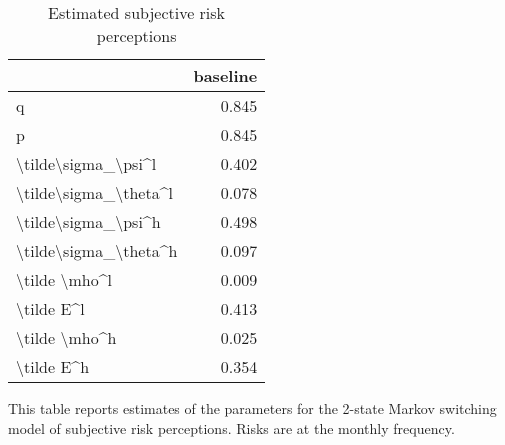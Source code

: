 
\begin{table}[p]
\centering
\begin{adjustbox}{width=0.3\textwidth}
\begin{threeparttable}
\caption{Estimated subjective risk perceptions}
\label{tab:PRMarkovEst}\begin{tabular}{lr}
\toprule
{} &  baseline \\
\midrule
q                     &     0.845 \\
p                     &     0.845 \\
\textbackslash tilde\textbackslash sigma\_\textbackslash psi\textasciicircum l   &     0.402 \\
\textbackslash tilde\textbackslash sigma\_\textbackslash theta\textasciicircum l &     0.078 \\
\textbackslash tilde\textbackslash sigma\_\textbackslash psi\textasciicircum h   &     0.498 \\
\textbackslash tilde\textbackslash sigma\_\textbackslash theta\textasciicircum h &     0.097 \\
\textbackslash tilde \textbackslash mho\textasciicircum l         &     0.009 \\
\textbackslash tilde E\textasciicircum l            &     0.413 \\
\textbackslash tilde \textbackslash mho\textasciicircum h         &     0.025 \\
\textbackslash tilde E\textasciicircum h            &     0.354 \\
\bottomrule
\end{tabular}
\begin{tablenotes}\item This table reports estimates of the parameters 
for the 2-state Markov switching model of subjective risk perceptions. Risks are at the monthly frequency. 
\end{tablenotes}
\end{threeparttable}
\end{adjustbox}
\end{table}